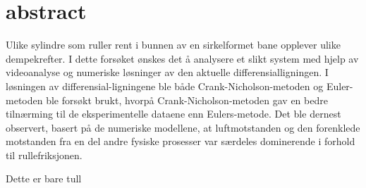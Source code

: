 
\section{abstract}
Ulike sylindre som ruller rent i bunnen av en sirkelformet bane opplever ulike dempekrefter.
I dette forsøket ønskes det å analysere et slikt system med hjelp av videoanalyse og numeriske løsninger av den aktuelle differensial\-ligningen. I løsningen av differensial-ligningene ble både Crank-Nicholson-metoden og Euler-metoden ble forsøkt brukt, hvorpå Crank-Nicholson-metoden gav en bedre tilnærming til de eksperimentelle dataene enn Eulers-metode. Det ble dernest observert, basert på de numeriske modellene, at luftmotstanden og den forenklede motstanden fra en del andre fysiske prosesser var særdeles dominerende i forhold til rullefriksjonen.


Dette er bare tull